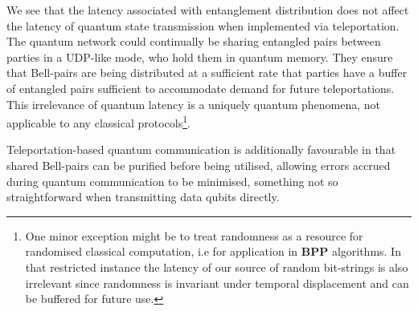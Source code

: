 We see that the latency associated with entanglement distribution does not affect the latency of quantum state transmission when implemented via teleportation. The quantum network could continually be sharing entangled pairs between parties in a UDP-like mode, who hold them in quantum memory. They ensure that Bell-pairs are being distributed at a sufficient rate that parties have a buffer of entangled pairs sufficient to accommodate demand for future teleportations. This irrelevance of quantum latency is a uniquely quantum phenomena, not applicable to any classical protocols\footnote{One minor exception might be to treat randomness as a resource for randomised classical computation, i.e for application in \textbf{BPP} algorithms. In that restricted instance the latency of our source of random bit-strings is also irrelevant since randomness is invariant under temporal displacement and can be buffered for future use.}.

Teleportation-based quantum communication is additionally favourable in that shared Bell-pairs can be purified before being utilised, allowing errors accrued during quantum communication to be minimised, something not so straightforward when transmitting data qubits directly.
